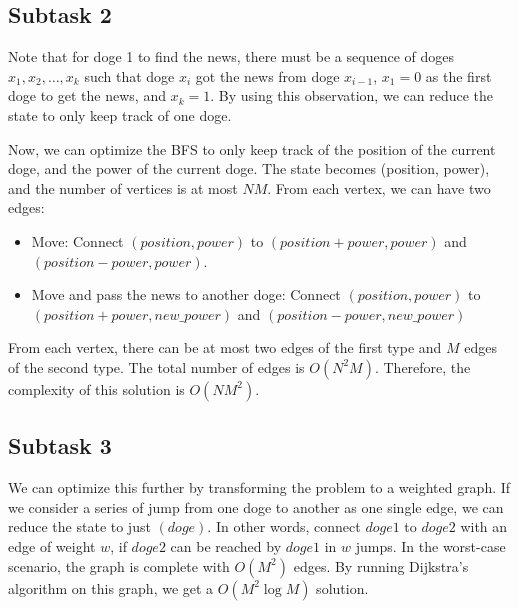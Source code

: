 \documentclass[a4paper]{article}
\begin{document}
\subsection*{Subtask 2}
Note that for doge 1 to find the news, there must be a sequence of doges ${x_1, x_2, \ldots, x_k}$ such that doge $x_i$ got the news from doge $x_{i-1}$, $x_1 = 0$ as the first doge to get the news, and $x_k = 1$. By using this observation, we can reduce the state to only keep track of one doge.

Now, we can optimize the BFS to only keep track of the position of the current doge, and the power of the current doge. The state becomes (position, power), and the number of vertices is at most $NM$. From each vertex, we can have two edges:
\begin{itemize}
	\item Move: Connect $(position, power)$ to $(position + power, power)$ and $(position - power, power)$.
	\item Move and pass the news to another doge: Connect $(position, power)$ to $(position + power, new\_ power)$ and $(position - power, new\_ power)$
\end{itemize}
From each vertex, there can be at most two edges of the first type and $M$ edges of the second type. The total number of edges is $O(N^2M)$. Therefore, the complexity of this solution is $O(NM^2)$.

\subsection*{Subtask 3}
We can optimize this further by transforming the problem to a weighted graph.
If we consider a series of jump from one doge to another as one single edge, we can reduce the state to just $(doge)$. In other words, connect $doge1$ to $doge2$ with an edge of weight $w$, if $doge2$ can be reached by $doge1$ in $w$ jumps. In the worst-case scenario, the graph is complete with $O(M^2)$ edges. By running Dijkstra's algorithm on this graph, we get a $O(M^2 \log M)$ solution.
\end{document}

